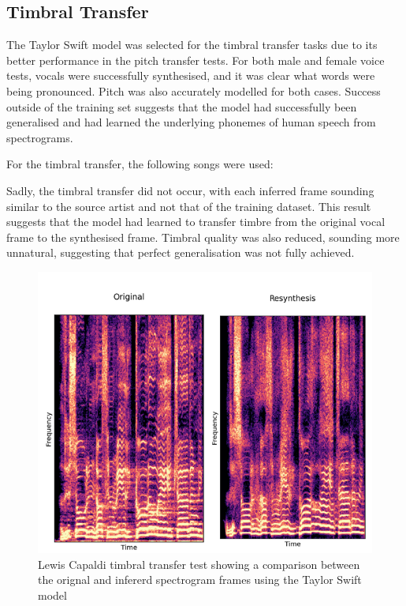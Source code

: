 \subsection{Timbral Transfer}

The Taylor Swift model was selected for the timbral transfer tasks due to its better performance in the pitch transfer tests. For both male and female voice tests, vocals were successfully synthesised, and it was clear what words were being pronounced. Pitch was also accurately modelled for both cases. Success outside of the training set suggests that the model had successfully been generalised and had learned the underlying phonemes of human speech from spectrograms.

For the timbral transfer, the following songs were used:

\vspace{0.5cm}
\vspace{0.5cm}

Sadly, the timbral transfer did not occur, with each inferred frame sounding similar to the source artist and not that of the training dataset. This result suggests that the model had learned to transfer timbre from the original vocal frame to the synthesised frame. Timbral quality was also reduced, sounding more unnatural, suggesting that perfect generalisation was not fully achieved. 

\begin{figure}[H]
    \centering
    \includegraphics[width=\textwidth]{research/results/LewisCapaldi/TimbralTransfer.png}
    \caption{Lewis Capaldi timbral transfer test showing a comparison between the orignal and infererd spectrogram frames using the Taylor Swift model}
\end{figure}

